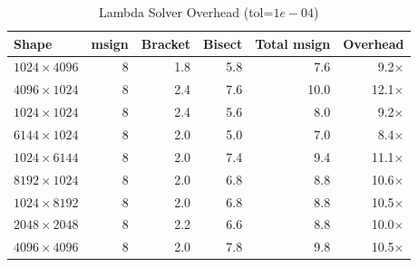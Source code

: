 \begin{table}[t]
\centering
\caption{Lambda Solver Overhead (tol=$1e-04$)}
\label{tab:lambda_solver_overhead}
\begin{tabular}{lrrrrr}
\toprule
Shape & msign & Bracket & Bisect & Total msign & Overhead \\
\midrule
$1024\times4096$ & 8 & 1.8 & 5.8 & 7.6 & 9.2$\times$ \\
$4096\times1024$ & 8 & 2.4 & 7.6 & 10.0 & 12.1$\times$ \\
$1024\times1024$ & 8 & 2.4 & 5.6 & 8.0 & 9.2$\times$ \\
$6144\times1024$ & 8 & 2.0 & 5.0 & 7.0 & 8.4$\times$ \\
$1024\times6144$ & 8 & 2.0 & 7.4 & 9.4 & 11.1$\times$ \\
$8192\times1024$ & 8 & 2.0 & 6.8 & 8.8 & 10.6$\times$ \\
$1024\times8192$ & 8 & 2.0 & 6.8 & 8.8 & 10.5$\times$ \\
$2048\times2048$ & 8 & 2.2 & 6.6 & 8.8 & 10.0$\times$ \\
$4096\times4096$ & 8 & 2.0 & 7.8 & 9.8 & 10.5$\times$ \\
\bottomrule
\end{tabular}
\end{table}
